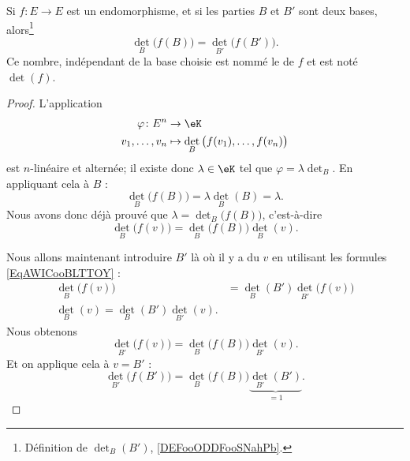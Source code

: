 \begin{lemmaDef}       \label{LEMooQTRVooAKzucd}      \label{DefCOZEooGhRfxA}
    Si \( f\colon E\to E\) est un endomorphisme, et si les parties \( B\) et \( B'\) sont deux bases, alors\footnote{Définition de \( \det_B(B')\), \ref{DEFooODDFooSNahPb}.}
	\begin{equation}
		\det_B\big( f(B) \big)=\det_{B'}\big( f(B') \big).
	\end{equation}
	Ce nombre, indépendant de la base choisie est nommé le  de \( f\) et est noté \( \det(f)\).
\end{lemmaDef}

\begin{proof}
	L'application
	\begin{equation}
		\begin{aligned}
			\varphi\colon E^n & \to \eK                                         \\
			v_1,\ldots, v_n   & \mapsto \det_B\big( f(v_1),\ldots, f(v_n) \big)
		\end{aligned}
	\end{equation}
	est \( n\)-linéaire et alternée; il existe donc \( \lambda\in \eK\) tel que \( \varphi=\lambda\det_B\). En appliquant cela à \( B\) :
	\begin{equation}
		\det_B\big( f(B) \big)=\lambda \det_B(B)=\lambda.
	\end{equation}
	Nous avons donc déjà prouvé que \( \lambda=\det_B\big( f(B) \big)\), c'est-à-dire
	\begin{equation}
		\det_B\big( f(v) \big)=\det_B\big( f(B) \big)\det_B(v).
	\end{equation}

	Nous allons maintenant introduire \( B'\) là où il y a du \( v\) en utilisant les formules \eqref{EqAWICooBLTTOY} :
	\begin{subequations}
		\begin{align}
			\det_B\big( f(v) \big) & =\det_B(B')\det_{B'}\big( f(v) \big) \\
			\det_B(v)=\det_B(B')\det_{B'}(v).
		\end{align}
	\end{subequations}
	Nous obtenons
	\begin{equation}
		\det_{B'}\big( f(v) \big)=\det_B\big( f(B) \big)\det_{B'}(v).
	\end{equation}
	Et on applique cela à \( v=B'\) :
	\begin{equation}
		\det_{B'}\big( f(B') \big)=\det_B\big( f(B) \big)\underbrace{\det_{B'}(B')}_{=1}.
	\end{equation}
\end{proof}

